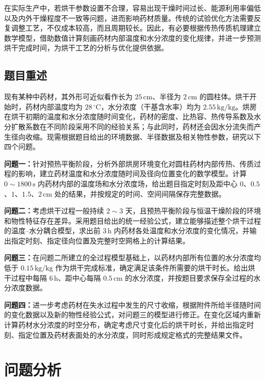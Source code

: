 \documentclass[12pt,a4paper,fontset=none]{ctexart}
\begin{document}
在实际生产中，若烘干参数设置不合理，容易出现干燥时间过长、能源利用率偏低以及内外干燥程度不一致等问题，进而影响药材质量。传统的试验优化方法需要反复调整工艺，不仅成本较高，而且周期较长。因此，有必要根据传热传质机理建立数学模型，借助数值计算刻画药材内部温度和水分浓度的变化规律，并进一步预测烘干完成时间，为烘干工艺的分析与优化提供依据。

\subsection{题目重述}

现有某种中药材，其外形可近似看作长为 $25\,\mathrm{cm}$、半径为 $2\,\mathrm{cm}$ 的圆柱体。烘干开始时，药材内部温度均为 $28\,{}^\circ\mathrm{C}$，水分浓度（干基含水率）均为 $2.55\,\mathrm{kg/kg}$。烘房在烘干初期的温度和水分浓度随时间变化，药材的密度、比热容、热传导系数及水分扩散系数在不同阶段采用不同的经验关系；与此同时，药材还会因水分流失而产生径向收缩。现需根据题目给出的环境数据、半径数据及相关物性参数，研究以下四个问题。

\textbf{问题一：}针对预热平衡阶段，分析外部烘房环境变化对圆柱药材内部传热、传质过程的影响，建立药材温度和水分浓度随时间及径向位置变化的数学模型。计算 $0\sim1800\,\mathrm{s}$ 内药材内部的温度场和水分浓度场，给出题目指定时刻及距中心 $0$、$0.5$、$1$、$1.5$、$2\,\mathrm{cm}$ 处的结果，并按规定的时间、空间间隔保存完整数据。

\textbf{问题二：}考虑烘干过程一般持续 $2\sim3$ 天，且预热平衡阶段与恒温干燥阶段的环境和物性特征存在差异。采用题目给出的统一经验公式，建立能够描述整个烘干过程的温度--水分耦合模型，求出前 $3\,\mathrm{h}$ 内药材各处温度和水分浓度的变化情况，并输出指定时刻、指定径向位置及完整时空网格上的计算结果。

\textbf{问题三：}在问题二所建立的全过程模型基础上，以药材内部所有位置的水分浓度均低于 $0.15\,\mathrm{kg/kg}$ 作为烘干完成标准，确定满足该条件所需要的烘干时长。给出烘干过程中每隔 $6\,\mathrm{h}$、距中心每隔 $0.5\,\mathrm{cm}$ 的水分浓度，并按题目要求保存全过程的水分浓度数据。

\textbf{问题四：}进一步考虑药材在失水过程中发生的尺寸收缩，根据附件所给半径随时间的变化数据以及新的物性经验公式，对问题三的模型进行修正。在变化区域内重新计算药材水分浓度的时空分布，确定考虑尺寸变化后的烘干时长，并给出指定时刻、指定位置及药材表面处的水分浓度，同时形成规定格式的完整结果文件。



\section{问题分析}
\end{document}
